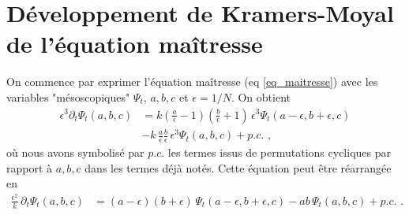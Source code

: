 \documentclass[openany,a4paper,12pt]{article}
\begin{document}
\section{Développement de Kramers-Moyal de l'équation maîtresse}

\par On commence par exprimer l'équation maîtresse (eq \ref{eq_maitresse}) avec les variables "mésoscopiques" $\Psi_t$, $a,b,c$ et $\epsilon=1/N$. On obtient
%
\begin{equation}\label{eq_maitresse_minuscules}
\begin{split}
	\epsilon ^3 \partial_t \Psi_t(a,b,c) 
	&= k \left( \frac a \epsilon - 1 \right) \left( \frac b \epsilon + 1\right)  \, \epsilon^3 \Psi_t(a-\epsilon, b+\epsilon, c) \\
	&- k\, \frac a \epsilon \frac b \epsilon \, \epsilon^3 \Psi_t(a,b,c) + p.c. \,\, ,
\end{split}
\end{equation}
%
où nous avons symbolisé par $p.c.$ les termes issus de permutations cycliques par rapport à $a,b,c$ dans les termes déjà notés. Cette équation peut être réarrangée en
%
\begin{equation}\label{eq_maitresse_minuscules_clean}
\begin{split}
	\frac{\epsilon^2}{k}\, \partial_t \Psi_t(a,b,c) 
	&= (a-\epsilon)(b+\epsilon)  \, \Psi_t(a-\epsilon, b+\epsilon, c) 
	- ab \, \Psi_t(a,b,c) + p.c. \,\, .
\end{split}
\end{equation}
%
\end{document}

